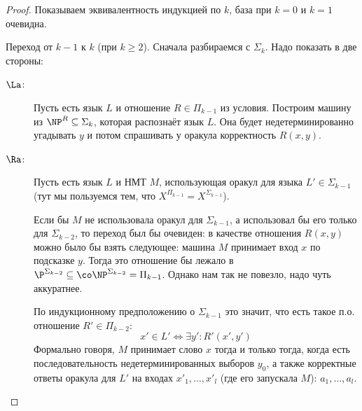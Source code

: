 	\begin{proof}
		Показываем эквивалентность индукцией по $k$, база при $k=0$ и $k=1$ очевидна.

		Переход от $k-1$ к $k$ (при $k \ge 2$).
		Сначала разбираемся с $\Sigma_{k}$.
		Надо показать в две стороны:
		\begin{description}
			\item[$\La$:]
				Пусть есть язык $L$ и отношение $R \in \Pi_{k-1}$ из условия.
				Построим машину из $\NP^R \subseteq \Sigma_k$, которая распознаёт язык $L$.
				Она будет недетерминированно угадывать $y$ и потом спрашивать у оракула корректность $R(x, y)$.
			\item[$\Ra$:]
				Пусть есть язык $L$ и НМТ $M$, использующая оракул для языка $L' \in \Sigma_{k-1}$
				(тут мы пользуемся тем, что $X^{\Pi_{k-1}} = X^{\Sigma_{k-1}}$).
				\begin{Rem}
					Если бы $M$ не использовала оракул для $\Sigma_{k-1}$, а использовал бы его только для $\Sigma_{k-2}$, то переход был бы очевиден:
					в качестве отношения $R(x, y)$ можно было бы взять следующее: машина $M$ принимает вход $x$ по подсказке $y$.
					Тогда это отношение бы лежало в $\P^{\Sigma_{k-2}} \subseteq \co\NP^{\Sigma_{k-2}} = \Pi_{k-1}$.
					Однако нам так не повезло, надо чуть аккуратнее.
				\end{Rem}
				По индукционному предположению о $\Sigma_{k-1}$ это значит, что есть такое п.о. отношение $R'\in \Pi_{k-2}$:
				\[ x' \in L' \iff \exists y' \colon R'(x', y') \]
				Формально говоря, $M$ принимает слово $x$ тогда и только тогда, когда есть последовательность недетерминированных выборов $y_0$,
				а также корректные ответы оракула для $L'$ на входах $x'_1, \dots, x'_l$ (где его запускала $M$): $a_1, \dots, a_l$.


\end{description}
\end{proof}
